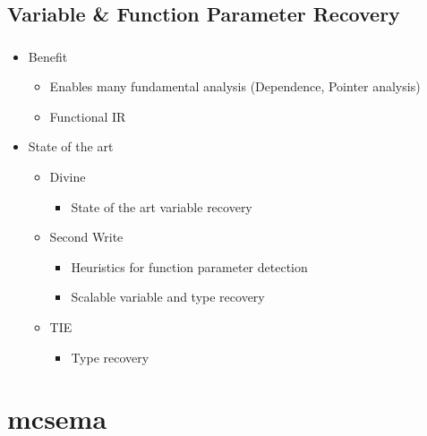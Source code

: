 \documentclass[mathserif,10pt]{beamer}
\newcommand{\cmt}[1]{}
\begin{document}
  \subsection{Variable \& Function Parameter Recovery}
  \frame
  {
    \frametitle{\subsecname}
    \begin{itemize}
      \item Benefit
        \begin{itemize}
          \item Enables many fundamental analysis (Dependence, Pointer analysis)
          \item Functional IR
        \end{itemize}
      \item State of the art
        \begin{itemize}
          \item Divine
            \begin{itemize}
              \item State of the art variable recovery %
            \end{itemize}     
          \item Second Write 
            \begin{itemize}
              \item Heuristics for function parameter  detection
              \item Scalable variable and type recovery
            \end{itemize}     
          \item TIE %
            \begin{itemize}
              \item Type recovery
            \end{itemize}     
        \end{itemize}
    \end{itemize}

    \cmt{
      Not scalable
    }

  }


\section{mcsema}
\end{document}

